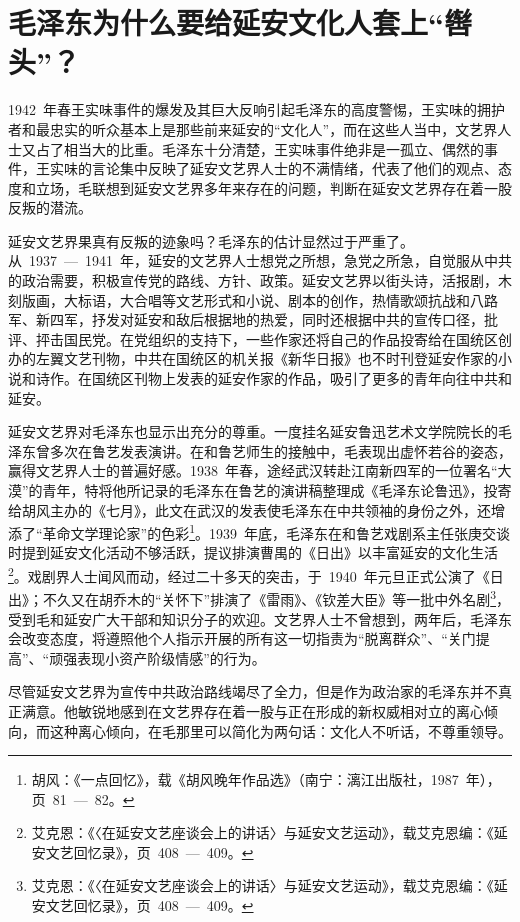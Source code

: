 \section{毛泽东为什么要给延安文化人套上“辔头”？}

1942~年春王实味事件的爆发及其巨大反响引起毛泽东的高度警惕，王实味的拥护者和最忠实的听众基本上是那些前来延安的“文化人”，而在这些人当中，文艺界人士又占了相当大的比重。毛泽东十分清楚，王实味事件绝非是一孤立、偶然的事件，王实味的言论集中反映了延安文艺界人士的不满情绪，代表了他们的观点、态度和立场，毛联想到延安文艺界多年来存在的问题，判断在延安文艺界存在着一股反叛的潜流。

延安文艺界果真有反叛的迹象吗？毛泽东的估计显然过于严重了。从~1937~—~1941~年，延安的文艺界人士想党之所想，急党之所急，自觉服从中共的政治需要，积极宣传党的路线、方针、政策。延安文艺界以街头诗，活报剧，木刻版画，大标语，大合唱等文艺形式和小说、剧本的创作，热情歌颂抗战和八路军、新四军，抒发对延安和敌后根据地的热爱，同时还根据中共的宣传口径，批评、抨击国民党。在党组织的支持下，一些作家还将自己的作品投寄给在国统区创办的左翼文艺刊物，中共在国统区的机关报《新华日报》也不时刊登延安作家的小说和诗作。在国统区刊物上发表的延安作家的作品，吸引了更多的青年向往中共和延安。

延安文艺界对毛泽东也显示出充分的尊重。一度挂名延安鲁迅艺术文学院院长的毛泽东曾多次在鲁艺发表演讲。在和鲁艺师生的接触中，毛表现出虚怀若谷的姿态，赢得文艺界人士的普遍好感。1938~年春，途经武汉转赴江南新四军的一位署名“大漠”的青年，特将他所记录的毛泽东在鲁艺的演讲稿整理成《毛泽东论鲁迅》，投寄给胡风主办的《七月》，此文在武汉的发表使毛泽东在中共领袖的身份之外，还增添了“革命文学理论家”的色彩\footnote{胡风：《一点回忆》，载《胡风晚年作品选》（南宁：漓江出版社，1987~年），页~81~—~82。}。1939~年底，毛泽东在和鲁艺戏剧系主任张庚交谈时提到延安文化活动不够活跃，提议排演曹禺的《日出》以丰富延安的文化生活\footnote{艾克恩：《〈在延安文艺座谈会上的讲话〉与延安文艺运动》，载艾克恩编：《延安文艺回忆录》，页~408~—~409。}。戏剧界人士闻风而动，经过二十多天的突击，于~1940~年元旦正式公演了《日出》；不久又在胡乔木的“关怀下”排演了《雷雨》、《钦差大臣》等一批中外名剧\footnote{艾克恩：《〈在延安文艺座谈会上的讲话〉与延安文艺运动》，载艾克恩编：《延安文艺回忆录》，页~408~—~409。}，受到毛和延安广大干部和知识分子的欢迎。文艺界人士不曾想到，两年后，毛泽东会改变态度，将遵照他个人指示开展的所有这一切指责为“脱离群众”、“关门提高”、“顽强表现小资产阶级情感”的行为。

尽管延安文艺界为宣传中共政治路线竭尽了全力，但是作为政治家的毛泽东并不真正满意。他敏锐地感到在文艺界存在着一股与正在形成的新权威相对立的离心倾向，而这种离心倾向，在毛那里可以简化为两句话：文化人不听话，不尊重领导。

